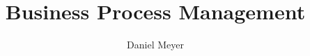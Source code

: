 
\title{Business Process Management}
\author{Daniel Meyer}

\newcommand{\Kurs}{Geschäftsprozessmanagement}
\newcommand{\guardian}{Prof. Dr. Herbert Fischer}

 